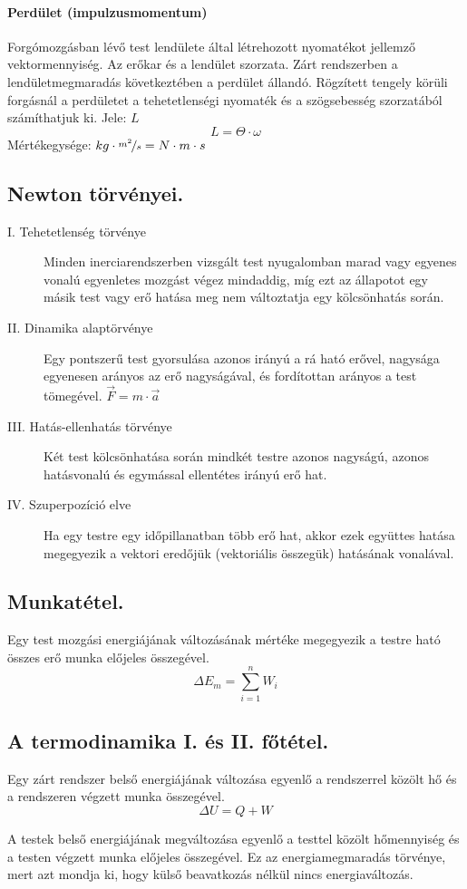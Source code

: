 \paragraph{Perdület (impulzusmomentum)} Forgómozgásban lévő test lendülete által létrehozott nyomatékot jellemző vektormennyiség. Az erőkar és a lendület szorzata. Zárt rendszerben a lendületmegmaradás következtében a perdület állandó. Rögzített tengely körüli forgásnál a perdületet a tehetetlenségi nyomaték és a szögsebesség szorzatából számíthatjuk ki.
Jele: $L$	$$L=\Theta \cdot \omega$$
Mértékegysége: $kg\cdot \nicefrac{m^2}{s} = N \cdot m \cdot s$

\subsection{Newton törvényei.}
\begin{description}
	\item[I. Tehetetlenség törvénye] Minden inerciarendszerben vizsgált test nyugalomban marad vagy egyenes vonalú egyenletes mozgást végez mindaddig, míg ezt az állapotot egy másik test vagy erő hatása meg nem változtatja egy kölcsönhatás során.

	\item[II. Dinamika alaptörvénye] Egy pontszerű test gyorsulása azonos irányú a rá ható erővel, nagysága egyenesen arányos az erő nagyságával, és fordítottan arányos a test tömegével. $\vec{F}=m \cdot \vec{a}$

	\item[III. Hatás-ellenhatás törvénye] Két test kölcsönhatása során mindkét testre azonos nagyságú, azonos hatásvonalú és egymással ellentétes irányú erő hat.

	\item[IV. Szuperpozíció elve] Ha egy testre egy időpillanatban több erő hat, akkor ezek együttes hatása megegyezik a vektori eredőjük (vektoriális összegük) hatásának vonalával.
\end{description}

\subsection{Munkatétel.}
\begin{theorem}
	Egy test mozgási energiájának változásának mértéke megegyezik a testre ható összes erő munka előjeles összegével.
	$$\Delta E_m = \sum_{i=1}^{n}W_i$$
\end{theorem}

\subsection{A termodinamika I. és II. főtétel.}
\begin{theorem}[I. főtétel]
	Egy zárt rendszer belső energiájának változása egyenlő a rendszerrel közölt hő és a rendszeren végzett munka összegével.
	$$ \Delta U = Q+W $$
\end{theorem}
A testek belső energiájának megváltozása egyenlő a testtel közölt hőmennyiség és a testen végzett munka előjeles összegével. Ez az energiamegmaradás törvénye, mert azt mondja ki, hogy külső beavatkozás nélkül nincs energiaváltozás.

